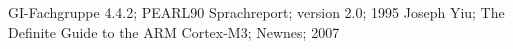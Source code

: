 \begin{thebibliography}{99}
 GI-Fachgruppe 4.4.2; PEARL90 Sprachreport; version 2.0; 1995
 Joseph Yiu; The Definite Guide to the ARM Cortex-M3; Newnes; 2007

\end{thebibliography}
